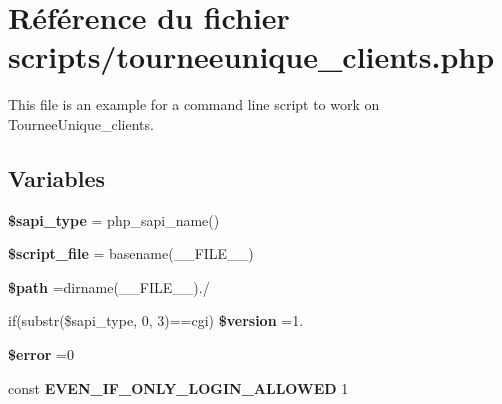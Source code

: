 \hypertarget{tourneeunique__clients_8php}{}\section{Référence du fichier scripts/tourneeunique\+\_\+clients.php}
\label{tourneeunique__clients_8php}


This file is an example for a command line script to work on Tournee\+Unique\+\_\+clients.  


\subsection*{Variables}
\begin{DoxyCompactItemize}
\item 
\mbox{\label{tourneeunique__clients_8php_a86e02f00a36d0fcbf274de973b2640d0}} 
{\bfseries \$sapi\+\_\+type} = php\+\_\+sapi\+\_\+name()
\item 
\mbox{\label{tourneeunique__clients_8php_a97b9f047572d6c50f29fbea522f6c17e}} 
{\bfseries \$script\+\_\+file} = basename(\+\_\+\+\_\+\+F\+I\+L\+E\+\_\+\+\_\+)
\item 
\mbox{\label{tourneeunique__clients_8php_a0a4baf0b22973c07685c3981f0d17fc4}} 
{\bfseries \$path} =dirname(\+\_\+\+\_\+\+F\+I\+L\+E\+\_\+\+\_\+).\textquotesingle{}/\textquotesingle{}
\item 
\mbox{\label{tourneeunique__clients_8php_a0a351317886caa2358df1658880c0c78}} 
if(substr(\$sapi\+\_\+type, 0, 3)==\textquotesingle{}cgi\textquotesingle{}) {\bfseries \$version} =\textquotesingle{}1.\textquotesingle{}
\item 
\mbox{\label{tourneeunique__clients_8php_aeba2ab722cedda53dbb7ec1a59f45550}} 
{\bfseries \$error} =0
\item 
\mbox{\label{tourneeunique__clients_8php_a2b87986264c1ca3cddb96a106af7b37a}} 
const {\bfseries E\+V\+E\+N\+\_\+\+I\+F\+\_\+\+O\+N\+L\+Y\+\_\+\+L\+O\+G\+I\+N\+\_\+\+A\+L\+L\+O\+W\+ED} 1
\item 
\mbox{\label{tourneeunique__clients_8php_a49a8a4009b02e49717caa88b128affc5}} 

\end{DoxyCompactItemize}
